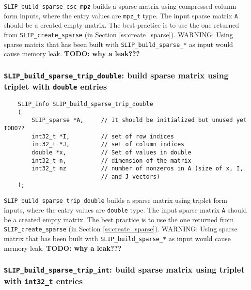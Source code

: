 \documentclass[12pt]{article}
\theoremstyle{definition}
\begin{document}
\verb|SLIP_build_sparse_csc_mpz| builds a sparse matrix using compressed column
form inputs, where the entry values are \verb|mpz_t| type. The input sparse
matrix \verb|A| should be a created empty matrix. The best practice is
to use the one returned from \verb|SLIP_create_sparse| (in Section
\ref{ss:create_sparse}). WARNING: Using sparse matrix that has been built with
\verb|SLIP_build_sparse_*| as input would cause memory leak.
{\bf TODO: why a leak???} %

\cprotect\subsubsection{\verb|SLIP_build_sparse_trip_double|: build sparse matrix using triplet with \verb|double| entries}
\label{s:user:build_sparse_trip_double}

\begin{mdframed}[userdefinedwidth=6in]
{\footnotesize
\begin{verbatim}
    SLIP_info SLIP_build_sparse_trip_double
    (
        SLIP_sparse *A,     // It should be initialized but unused yet TODO??
        int32_t *I,         // set of row indices
        int32_t *J,         // set of column indices
        double *x,          // Set of values in double
        int32_t n,          // dimension of the matrix
        int32_t nz          // number of nonzeros in A (size of x, I,
                            // and J vectors)
    );
\end{verbatim}
} \end{mdframed}

\verb|SLIP_build_sparse_trip_double| builds a sparse matrix using triplet form
inputs, where the entry values are \verb|double| type. The input sparse matrix
\verb|A| should be a created empty matrix. The best practice is to use
the one returned from \verb|SLIP_create_sparse| (in Section
\ref{ss:create_sparse}). WARNING: Using sparse matrix that has been built with
\verb|SLIP_build_sparse_*| as input would cause memory leak.
{\bf TODO: why a leak???} %

\cprotect\subsubsection{\verb|SLIP_build_sparse_trip_int|: build sparse matrix using triplet with \verb|int32_t| entries}
\label{s:user:build_sparse_trip_int}
\end{document}
